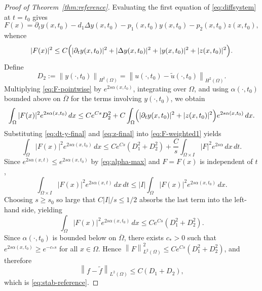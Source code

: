 \documentclass[12pt]{amsart}
\theoremstyle{plain}
\theoremstyle{definition}
\theoremstyle{remark}
\newcommand{\p}{\partial}
\newcommand{\norm}[1]{\left\lVert#1\right\rVert}
\newcommand{\Om}{\Omega}
\newcommand{\Lap}{\Delta}
\begin{document}
\begin{proof}[Proof of Theorem~\ref{thm:reference}]
Evaluating the first equation of \eqref{eq:diffsystem} at $t=t_0$ gives
\begin{equation}\label{eq:source-identity}
F(x)=\p_t y(x,t_0)-d_1\Lap y(x,t_0)
-p_1(x,t_0)y(x,t_0)-p_2(x,t_0)z(x,t_0),
\end{equation}
whence
\begin{equation}\label{eq:F-pointwise}
|F(x)|^2\le C\Bigl(|\p_t y(x,t_0)|^2+|\Lap y(x,t_0)|^2
+|y(x,t_0)|^2+|z(x,t_0)|^2\Bigr).
\end{equation}
Define
\begin{equation}\label{eq:D2-def}
D_2:=\norm{y(\cdot,t_0)}_{H^2(\Om)}
=\norm{u(\cdot,t_0)-\tilde u(\cdot,t_0)}_{H^2(\Om)}.
\end{equation}
Multiplying \eqref{eq:F-pointwise} by $e^{2s\alpha(x,t_0)}$, integrating
over $\Om$, and using $\alpha(\cdot,t_0)$ bounded above on $\overline\Om$
for the terms involving $y(\cdot,t_0)$, we obtain
\begin{equation}\label{eq:F-weighted1}
\int_\Om |F(x)|^2 e^{2s\alpha(x,t_0)}\,dx
\le C e^{Cs} D_2^2
+C\int_\Om\Bigl(|\p_t y(x,t_0)|^2+|z(x,t_0)|^2\Bigr)
e^{2s\alpha(x,t_0)}\,dx.
\end{equation}
Substituting \eqref{eq:dt-y-final} and \eqref{eq:z-final} into
\eqref{eq:F-weighted1} yields
\begin{equation}\label{eq:F-weighted2}
\int_\Om |F(x)|^2 e^{2s\alpha(x,t_0)}\,dx
\le C e^{Cs}(D_1^2+D_2^2)
+\frac{C}{s}\int_{\Om\times I}|F|^2 e^{2s\alpha}\,dx\,dt.
\end{equation}
Since $e^{2s\alpha(x,t)}\le e^{2s\alpha(x,t_0)}$ by \eqref{eq:alpha-max}
and $F=F(x)$ is independent of $t$,
\[
\int_{\Om\times I}|F(x)|^2 e^{2s\alpha(x,t)}\,dx\,dt
\le |I|\int_\Om |F(x)|^2 e^{2s\alpha(x,t_0)}\,dx.
\]
Choosing $s\ge s_0$ so large that $C|I|/s\le 1/2$ absorbs the last term into
the left-hand side, yielding
\[
\int_\Om |F(x)|^2 e^{2s\alpha(x,t_0)}\,dx
\le C e^{Cs}(D_1^2+D_2^2).
\]
Since $\alpha(\cdot,t_0)$ is bounded below on $\overline\Om$, there exists
$c_*>0$ such that $e^{2s\alpha(x,t_0)}\ge e^{-c_* s}$ for all
$x\in\Om$.
Hence
$\norm{F}_{L^2(\Om)}^2\le C e^{Cs}(D_1^2+D_2^2)$,
and therefore
$$\norm{f-\tilde f}_{L^2(\Om)}\le C(D_1+D_2),$$
which is \eqref{eq:stab-reference}.
\end{proof}




\end{document}
